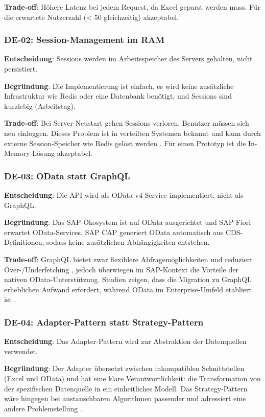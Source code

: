 \textbf{Trade-off}: Höhere Latenz bei jedem Request, da Excel geparst werden muss. Für die erwartete Nutzerzahl (< 50 gleichzeitig) akzeptabel.

\subsubsection{DE-02: Session-Management im RAM}

\textbf{Entscheidung}: Sessions werden im Arbeitsspeicher des Servers gehalten, nicht persistiert.

\textbf{Begründung}: Die Implementierung ist einfach, es wird keine zusätzliche Infrastruktur wie Redis oder eine Datenbank benötigt, und Sessions sind kurzlebig (Arbeitstag).

\textbf{Trade-off}: Bei Server-Neustart gehen Sessions verloren. Benutzer müssen sich neu einloggen. Dieses Problem ist in verteilten Systemen bekannt und kann durch externe Session-Speicher wie Redis gelöst werden \citep{tanenbaum2017, richardson2018}. Für einen Prototyp ist die In-Memory-Lösung akzeptabel.

\subsubsection{DE-03: OData statt GraphQL}

\textbf{Entscheidung}: Die API wird als OData v4 Service implementiert, nicht als GraphQL.

\textbf{Begründung}: Das SAP-Ökosystem ist auf OData ausgerichtet und SAP Fiori erwartet OData-Services. SAP CAP generiert OData automatisch aus CDS-Definitionen, sodass keine zusätzlichen Abhängigkeiten entstehen.

\textbf{Trade-off}: GraphQL bietet zwar flexiblere Abfragemöglichkeiten und reduziert Over-/Underfetching \citep{brito2019}, jedoch überwiegen im SAP-Kontext die Vorteile der nativen OData-Unterstützung. Studien zeigen, dass die Migration zu GraphQL erheblichen Aufwand erfordert, während OData im Enterprise-Umfeld etabliert ist \citep{vogel2018}.

\subsubsection{DE-04: Adapter-Pattern statt Strategy-Pattern}

\textbf{Entscheidung}: Das Adapter-Pattern wird zur Abstraktion der Datenquellen verwendet.

\textbf{Begründung}: Der Adapter übersetzt zwischen inkompatiblen Schnittstellen (Excel und OData) und hat eine klare Verantwortlichkeit: die Transformation von der spezifischen Datenquelle in ein einheitliches Modell. Das Strategy-Pattern wäre hingegen bei austauschbaren Algorithmen passender und adressiert eine andere Problemstellung \citep{gamma1994}.

